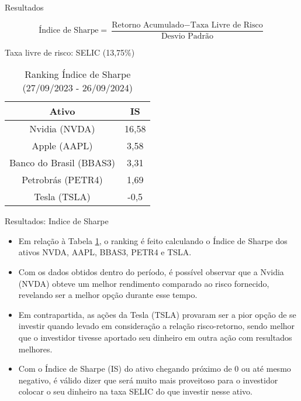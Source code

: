 \documentclass[aspectratio=169]{beamer}
\begin{document}
\begin{frame}{Resultados}

\begin{center}
\[
\text{Índice de Sharpe} = \frac{\text{Retorno Acumulado} - \text{Taxa Livre de Risco}}{\text{Desvio Padrão}}
\]
\end{center}

\vspace{0.5em}

\begin{center}
Taxa livre de risco: SELIC (13,75\%)
\end{center}


\begin{table}[h]
    \centering
    \large
    \begin{tabular}{|c|c|} %
        \hline %
        Ativo  & IS \\ %
        \hline %
        Nvidia (NVDA)   & 16,58   \\ %
        \hline %
        Apple (AAPL)   & 3,58   \\ %
        \hline %
        Banco do Brasil (BBAS3)  & 3,31   \\ %
        \hline %
        Petrobrás (PETR4)  & 1,69   \\ %
        \hline %
        Tesla (TSLA)   & -0,5  \\ %
        \hline %
    \end{tabular}
    \caption{Ranking Índice de Sharpe (27/09/2023 - 26/09/2024)}
    \label{tab:ranking_sharpe}
\end{table}
\end{frame}

\begin{frame}{Resultados: Indice de Sharpe}

    \begin{itemize}
        \item Em relação à Tabela \ref{tab:ranking_sharpe}, o ranking é feito calculando o Índice de Sharpe dos ativos NVDA, AAPL, BBAS3, PETR4 e TSLA.
        \item Com os dados obtidos dentro do período, é possível observar que a Nvidia (NVDA) obteve um melhor rendimento comparado ao risco fornecido, revelando ser a melhor opção durante esse tempo.
        \item Em contrapartida, as ações da Tesla (TSLA) provaram ser a pior opção de se investir quando levado em consideração a relação risco-retorno, sendo melhor que o investidor tivesse aportado seu dinheiro em outra ação com resultados melhores.
        \item Com o Índice de Sharpe (IS) do ativo chegando próximo de 0 ou até mesmo negativo, é válido dizer que será muito mais proveitoso para o investidor colocar o seu dinheiro na taxa SELIC do que investir nesse ativo.
    \end{itemize}

\end{frame}
\end{document}
